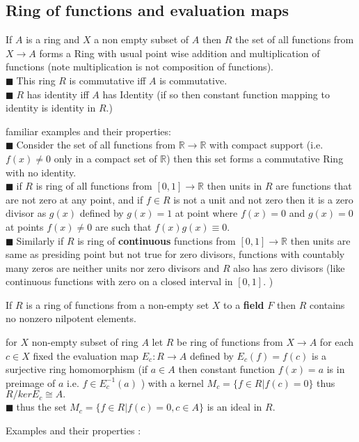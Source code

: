 \documentclass[11pt]{extarticle}
\newcommand{\ra}{\rightarrow}
\newcommand{\R}{\mathbb{R}}
\newcommand{\snote}[1]{{\footnotesize(#1)}}
\newcommand{\tbx}[2][]{
	\begin{tcolorbox}[enhanced,breakable,size=small,colback=black!2!white,title={#1},arc is angular, arc=1.5mm,drop fuzzy shadow]
		#2
	\end{tcolorbox}
}
\newcommand{\y}{$\blacksquare\;$}
\begin{document}
\begin{multicols}{2}
		\section{Ring of functions and evaluation maps}
		\tbx{ If $ A $ is a ring and $ X $ a non empty subset of $A $ then $ R $ the set of all functions from $ X\ra A $ forms a Ring with usual point  wise addition and multiplication of functions \snote{note multiplication is not composition of functions}.\\
		\y This ring $ R $ is commutative iff $ A $ is commutative.\\
		\y $ R $ has identity iff $ A $ has Identity \snote{if so then constant function mapping to identity is identity in $ R $.}\\}
		\tbx{ familiar examples and their properties:\\
			\y  Consider the set of all functions from $ \R \ra \R $ with compact support \snote{i.e. $ f(x)\neq 0 $ only in a compact set of $ \R $} then this set forms a commutative Ring with no identity.\\
			\y if $ R $ is ring of all functions from $ [0,1]\ra \R $ then units in $ R $ are functions that are not zero at any point, and if $ f\in  R$ is not a unit and not zero then it is a zero divisor as $ g(x) $ defined by $g(x)= 1 $ at point where $ f(x)=0 $ and $ g(x)=0 $ at points $ f(x)\neq 0 $ are such that $ f(x)g(x)\equiv0 $.\\
			\y Similarly if $ R $ is ring of \textbf{continuous} functions from $ [0,1]\ra \R $ then units are same as presiding point but not true for zero divisors, functions with countably many zeros are neither units nor zero divisors and $ R $ also has zero divisors \snote{like continuous functions with zero on a closed interval in $ [0,1] $. } }
		\tbx{ If $ R $ is a ring of functions from a non-empty set $ X $ to a \textbf{field} $ F $ then $ R $ contains no nonzero nilpotent elements. }
		\tbx[Evaluation map]{  for $ X $ non-empty subset of ring $ A $ let $ R $ be ring of functions from $ X\ra A $ for each $ c \in X$ fixed the evaluation map $ E_c:R\ra A $ defined by $ E_c(f)=f(c) $ is a surjective ring homomorphism \snote{if $ a\in A  $ then constant function $ f(x)=a $ is in preimage of $ a $ i.e. $ f\in E_c^{-1}(a) $ } with a kernel  $ M_c=\{f\in R|f(c)=0\} $ thus $ R/ker E_c \cong A. $\\
		\y thus the set $ M_c=\{f\in R|f(c)=0, c\in A\} $ is an ideal in $ R. $\\
		}
		\tbx{ Examples and their properties :\\
}
\end{multicols}
\end{document}
